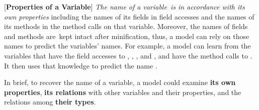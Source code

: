 \vspace{2pt}
 [{\bf Properties of a Variable}] {\em The
  name of a variable~is in accordance with its own properties}
including the names of its fields in field accesses and the names of
its methods in the method calls on that variable. Moreover, the names
of fields and methods are~kept intact after minification, thus, a
model can rely on those names to predict the variables' names. For
example, a model can learn from the variables that have the field
accesses to , ,
, and , and have the method
calls to .  It then uses that knowledge to
predict the name .


In brief, to recover the name of a variable, a model could examine {\bf its
own properties}, {\bf its relations} with other variables and their
properties, and the relations among {\bf their types}.















